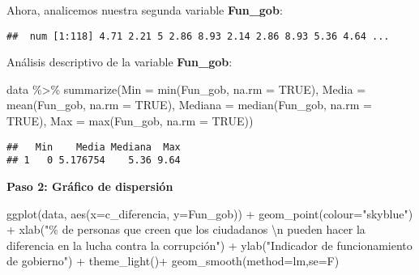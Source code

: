 \documentclass[
]{article}
\newenvironment{Shaded}{\begin{snugshade}}{\end{snugshade}}
\newcommand{\AttributeTok}[1]{\textcolor[rgb]{0.77,0.63,0.00}{#1}}
\newcommand{\ConstantTok}[1]{\textcolor[rgb]{0.00,0.00,0.00}{#1}}
\newcommand{\FunctionTok}[1]{\textcolor[rgb]{0.00,0.00,0.00}{#1}}
\newcommand{\NormalTok}[1]{#1}
\newcommand{\SpecialCharTok}[1]{\textcolor[rgb]{0.00,0.00,0.00}{#1}}
\newcommand{\StringTok}[1]{\textcolor[rgb]{0.31,0.60,0.02}{#1}}
\begin{document}
Ahora, analicemos nuestra segunda variable \textbf{Fun\_gob}:

\begin{Shaded}
\end{Shaded}

\begin{verbatim}
##  num [1:118] 4.71 2.21 5 2.86 8.93 2.14 2.86 8.93 5.36 4.64 ...
\end{verbatim}

Análisis descriptivo de la variable \textbf{Fun\_gob}:

\begin{Shaded}
\begin{Highlighting}[]
\NormalTok{data }\SpecialCharTok{\%\textgreater{}\%}
 \FunctionTok{summarize}\NormalTok{(}\AttributeTok{Min =} \FunctionTok{min}\NormalTok{(Fun\_gob, }\AttributeTok{na.rm =} \ConstantTok{TRUE}\NormalTok{),}
           \AttributeTok{Media =} \FunctionTok{mean}\NormalTok{(Fun\_gob, }\AttributeTok{na.rm =} \ConstantTok{TRUE}\NormalTok{),}
           \AttributeTok{Mediana =} \FunctionTok{median}\NormalTok{(Fun\_gob, }\AttributeTok{na.rm =} \ConstantTok{TRUE}\NormalTok{),}
           \AttributeTok{Max =} \FunctionTok{max}\NormalTok{(Fun\_gob, }\AttributeTok{na.rm =} \ConstantTok{TRUE}\NormalTok{))}
\end{Highlighting}
\end{Shaded}

\begin{verbatim}
##   Min    Media Mediana  Max
## 1   0 5.176754    5.36 9.64
\end{verbatim}

\textbf{Paso 2: Gráfico de dispersión}

\begin{Shaded}
\begin{Highlighting}[]
\FunctionTok{ggplot}\NormalTok{(data, }\FunctionTok{aes}\NormalTok{(}\AttributeTok{x=}\NormalTok{c\_diferencia, }\AttributeTok{y=}\NormalTok{Fun\_gob)) }\SpecialCharTok{+}
  \FunctionTok{geom\_point}\NormalTok{(}\AttributeTok{colour=}\StringTok{"skyblue"}\NormalTok{) }\SpecialCharTok{+}  \FunctionTok{xlab}\NormalTok{(}\StringTok{"\% de personas que creen que los ciudadanos }\SpecialCharTok{\textbackslash{}n}\StringTok{ pueden hacer la diferencia en la lucha contra la corrupción"}\NormalTok{) }\SpecialCharTok{+}  \FunctionTok{ylab}\NormalTok{(}\StringTok{"Indicador de funcionamiento de gobierno"}\NormalTok{) }\SpecialCharTok{+}
  \FunctionTok{theme\_light}\NormalTok{()}\SpecialCharTok{+} \FunctionTok{geom\_smooth}\NormalTok{(}\AttributeTok{method=}\NormalTok{lm,}\AttributeTok{se=}\NormalTok{F)}
\end{Highlighting}
\end{Shaded}
\end{document}
